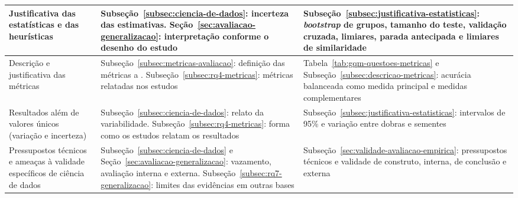 \begin{longtable}{|>{\raggedright\arraybackslash}p{3.3cm}|>{\raggedright\arraybackslash}p{6.0cm}|>{\raggedright\arraybackslash}p{5.6cm}|}
	Justificativa das estatísticas e das heurísticas
	                            & Subseção~\ref{subsec:ciencia-de-dados}: incerteza das estimativas. Seção~\ref{sec:avaliacao-generalizacao}: interpretação conforme o desenho do estudo
	                            & Subseção~\ref{subsec:justificativa-estatisticas}: \textit{bootstrap} de grupos, tamanho do teste, validação cruzada, limiares, parada antecipada e limiares de similaridade                                                                                                                                                                                          \\ \hline
	Descrição e justificativa das métricas
	                            & Subseção~\ref{subsec:metricas-avaliacao}: definição das métricas \metrica{M1} a \metrica{M12}. Subseção~\ref{subsec:rq4-metricas}: métricas relatadas nos estudos
	                            & Tabela~\ref{tab:gqm-questoes-metricas} e Subseção~\ref{subsec:descricao-metricas}: acurácia balanceada como medida principal e medidas complementares                                                                                                                                                                                                                \\ \hline
	Resultados além de valores únicos (variação e incerteza)
	                            & Subseção~\ref{subsec:ciencia-de-dados}: relato da variabilidade. Subseção~\ref{subsec:rq4-metricas}: forma como os estudos relatam os resultados
	                            & Subseção~\ref{subsec:justificativa-estatisticas}: intervalos de 95\% e variação entre dobras e sementes                                                                                                                                                                                                                                                              \\ \hline
	Pressupostos técnicos e ameaças à validade específicos de ciência de dados
	                            & Subseção~\ref{subsec:ciencia-de-dados} e Seção~\ref{sec:avaliacao-generalizacao}: vazamento, avaliação interna e externa. Subseção~\ref{subsec:rq7-generalizacao}: limites das evidências em outras bases
	                            & Subseção~\ref{sec:validade-avaliacao-empirica}: pressupostos técnicos e validade de construto, interna, de conclusão e externa                                                                                                                                                                                                                                       \\ \hline
\end{longtable}
\endgroup
{}

